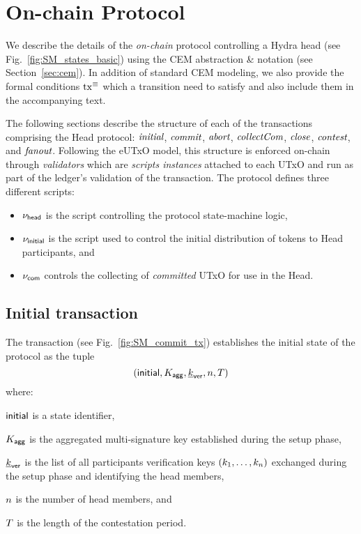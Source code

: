 \section{On-chain Protocol}\label{sec:on-chain}

We describe the details of the \emph{on-chain} protocol controlling a
Hydra head (see Fig.~\ref{fig:SM_states_basic}) using the CEM abstraction \&
notation (see Section~\ref{sec:cem}). In addition of standard CEM modeling, we
also provide the formal conditions $\mathrm{tx}^\equiv$ which a transition need to
satisfy and also include them in the accompanying text.

The following sections describe the structure of each of the transactions comprising the Head protocol: $\textit{initial}{}$, $\textit{commit}{}$, $\textit{abort}{}$, $\textit{collectCom}{}$, $\textit{close}{}$, $\textit{contest}{}$, and $\textit{fanout}{}$. Following the eUTxO model, this structure is enforced on-chain through \emph{validators} which are \emph{scripts instances} attached to each UTxO and run as part of the ledger's validation of the transaction. The protocol defines three different scripts: 
\begin{itemize}
    \item $\nu_\mathsf{head}$ is the script controlling the protocol state-machine logic,
    \item $\nu_\mathsf{initial}$ is the script used to control the initial distribution of tokens to Head participants, and
    \item $\nu_\mathsf{com}$ controls the collecting of \emph{committed} UTxO for use in the Head. 
\end{itemize}

\subsection{Initial transaction} 

The \mtxInit{} transaction (see
Fig.~\ref{fig:SM_commit_tx}) establishes the initial state of the protocol as the tuple
$$
(\mathsf{initial},K_{\mathsf{agg}},\underline{k}_{\mathsf{ver}},n,T)
$$ 
where:
\begin{menumerate}
    \item $\mathsf{initial}$ is
a state identifier, 
   \item $K_{\mathsf{agg}}$ is the aggregated multi-signature key established
during the setup phase, 
  \item $\underline{k}_{\mathsf{ver}}$ is the list of all participants verification
keys $(k_1,\ldots,k_n)$ exchanged during the setup phase and identifying the
head members, 
  \item $n$ is the number of head members, and 
  \item $T$ is the length of the contestation period.
\end{menumerate} 


